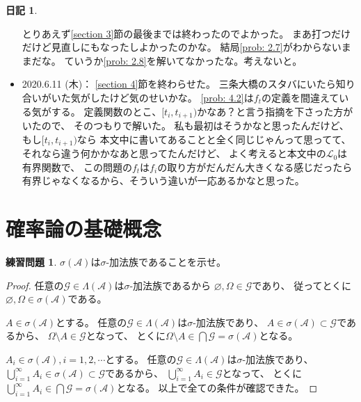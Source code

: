 \documentclass[uplatex]{jsarticle}
\theoremstyle{definition}
\newtheorem{prob}[prob]{練習問題}
\newtheorem*{nikki*}{日記}
\renewcommand{\emptyset}{\varnothing}
\def\mcA{\mathcal{A}}
\def\mcG{\mathcal{G}}
\def\mcL{\mathcal{L}}
\begin{document}
\begin{nikki*}
\begin{itemize}
    とりあえず\ref{section 3}節の最後までは終わったのでよかった。
    まあ打つだけだけど見直しにもなったしよかったのかな。
    結局\autoref{prob: 2.7}がわからないままだな。
    ていうか\autoref{prob: 2.8}を解いてなかったな。考えないと。
    \item 2020.6.11 (木)：
    \ref{section 4}節を終わらせた。
    三条大橋のスタバにいたら知り合いがいた気がしたけど気のせいかな。
    \autoref{prob: 4.2}は\(f_t\)の定義を間違えている気がする。
    定義関数のとこ、\([t_i,t_{i+1})\)かなあ？と言う指摘を下さった方がいたので、
    そのつもりで解いた。
    私も最初はそうかなと思ったんだけど、もし\([t_i,t_{i+1})\)なら
    本文中に書いてあることと全く同じじゃんって思ってて、
    それなら違う何かかなあと思ってたんだけど、
    よく考えると本文中の\(\mcL_0\)は有界関数で、
    この問題の\(f_t\)は\(f_i\)の取り方がだんだん大きくなる感じだったら
    有界じゃなくなるから、そういう違いが一応あるかなと思った。
  \end{itemize}
\end{nikki*}











\newpage
\section{確率論の基礎概念}
\label{section 1}

\begin{prob}\label{prob: 1.1}
  \(\sigma(\mcA)\)は\(\sigma\)-加法族であることを示せ。
\end{prob}

\begin{proof}
  任意の\(\mcG\in \Lambda(\mcA)\)は\(\sigma\)-加法族であるから
  \(\emptyset, \Omega\in \mcG\)であり、
  従ってとくに\(\emptyset,\Omega\in \sigma(\mcA)\)である。

  \(A\in \sigma(\mcA)\)とする。
  任意の\(\mcG\in\Lambda(\mcA)\)は\(\sigma\)-加法族であり、
  \(A\in \sigma(\mcA)\subset \mcG\)であるから、
  \(\Omega \setminus A \in \mcG\)となって、
  とくに\(\Omega\setminus A\in \bigcap \mcG = \sigma(\mcA)\)となる。

  \(A_i\in\sigma(\mcA) , i=1,2,\cdots\)とする。
  任意の\(\mcG\in\Lambda(\mcA)\)は\(\sigma\)-加法族であり、
  \(\bigcup_{i=1}^\infty A_i\in \sigma(\mcA)\subset \mcG\)であるから、
  \(\bigcup_{i=1}^\infty A_i \in \mcG\)となって、
  とくに\(\bigcup_{i=1}^\infty A_i\in \bigcap \mcG = \sigma(\mcA)\)となる。
  以上で全ての条件が確認できた。
\end{proof}
\end{document}
